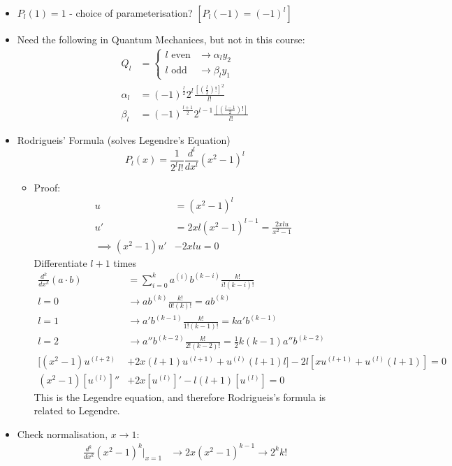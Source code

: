 \documentclass[Maths.tex]{subfiles}
\begin{document}
\begin{itemize}
\begin{itemize}
\begin{equation}
        \end{equation}
    \end{itemize}
    \item $P_l(1) = 1$ - choice of parameterisation? $[P_l(-1) = (-1)^l]$
    \item Need the following in Quantum Mechanices, but not in this course:
    \begin{align}
        Q_l &= \begin{cases} l \text{ even} & \to \alpha_ly_2 \\ l\text{ odd} & \to \beta_ly_1 \end{cases} \\
        \alpha_l &= (-1)^{\frac{l}{2}}2^l \frac{\left[\left(\frac{l}{2}\right)!\right]^2}{l!} \\
        \beta_l &= (-1)^{\frac{l+1}{2}}2^{l-1}\frac{\left[\left(\frac{l-1}{2}\right)!\right]}{l!}
    \end{align}
    \item Rodrigueis' Formula (solves Legendre's Equation)
    \begin{equation}
        P_l(x) = \frac{1}{2^l l!}\frac{d^l}{dx^l}(x^2 - 1)^l
    \end{equation}
    \begin{itemize}
        \item Proof:
        \begin{align}
            u &= (x^2 - 1)^l \\
            u' &= 2xl(x^2 - 1)^{l-1} = \frac{2xlu}{x^2 - 1} \\
            \implies (x^2 - 1)u' &- 2xlu = 0
        \end{align}
        Differentiate $l+1$ times
        \begin{align}
            \frac{d^k}{dx^k} (a\cdot b) &= \sum_{i=0}^k a^{(i)}b^{(k-i)}\frac{k!}{i!(k-i)!} \\
            l = 0 &\to ab^{(k)}\frac{k!}{0!(k)!} = ab^{(k)} \\
            l = 1 &\to a'b^{(k-1)}\frac{k!}{1!(k-1)!} = ka'b^{(k-1)} \\
            l = 2 &\to a''b^{(k-2)}\frac{k!}{2!(k-2)!} = \frac{1}{2}k(k-1)a''b^{(k-2)} \\
            [(x^2 -1)u^{(l+2)} &+ 2x(l+1)u^{(l+1)} + u^{(l)}(l+1)l] - 2l[xu^{(l+1)} + u^{(l)}(l+1)] = 0 \\
            (x^2 - 1)[u^{(l)}]'' &+ 2x[u^{(l)}]' - l(l+1)[u^{(l)}] = 0
        \end{align}
        This is the Legendre equation, and therefore Rodrigueis's formula is related to Legendre.
    \end{itemize}
    \item Check normalisation, $x\to1$:
    \begin{align}
        \frac{d^k}{dx^k} (x^2 - 1)^k\Big|_{x=1} &\to 2x(x^2 - 1)^{k-1} \to 2^kk!
    \end{align}
\end{itemize}
\end{document}
